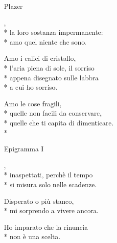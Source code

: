 \documentclass[12pt]{book}
\begin{document}
\begin{poem}{Plazer}{}

\settowidth{\versewidth}{non meno è ciò che meriti.}

\begin{altverse}
,\\*
la loro sostanza impermanente: \\*
amo quel niente che sono.
\end{altverse}

\begin{altverse}
Amo i calici di cristallo, \\*
l'aria piena di sole, il sorriso \\*
appena disegnato sulle labbra \\*
a cui ho sorriso.
\end{altverse}

\begin{altverse}
Amo le cose fragili, \\*
quelle non facili da conservare, \\*
quelle che ti capita di dimenticare. \\*
\end{altverse}

\end{poem}

\begin{poem}{Epigramma I}{}

\settowidth{\versewidth}{non meno è ciò che meriti.}

\begin{altverse}
,\\*
inaspettati, perchè il tempo \\*
si misura solo nelle scadenze.
\end{altverse}

\begin{altverse}
Disperato o più stanco, \\*
mi sorprendo a vivere ancora. 
\end{altverse}

\begin{altverse}
Ho imparato che la rinuncia \\*
non è una scelta.
\end{altverse}

\end{poem}
\end{document}
